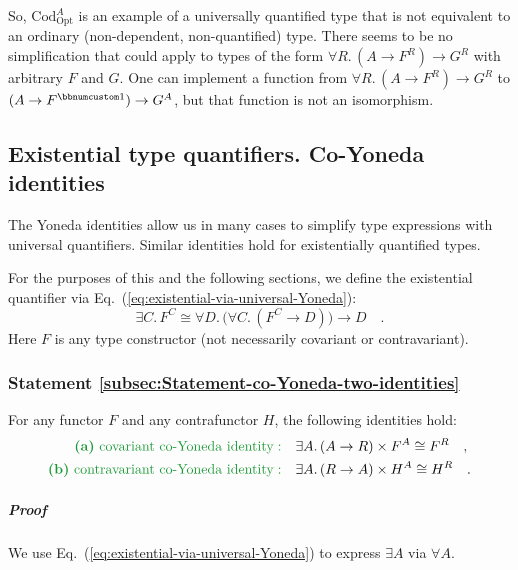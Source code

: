 So, $\text{Cod}_{\text{Opt}}^{A}$ is an example of a universally
quantified type that is not equivalent to an ordinary (non-dependent,
non-quantified) type. There seems to be no simplification that could
apply to types of the form $\forall R.\,(A\rightarrow F^{R})\rightarrow G^{R}$
with arbitrary $F$ and $G$. One can implement a function from $\forall R.\,(A\rightarrow F^{R})\rightarrow G^{R}$
to $(A\rightarrow F^{\bbnum 1})\rightarrow G^{A}$, but that function
is not an isomorphism.

\subsection{Existential type quantifiers. Co-Yoneda identities\label{subsec:Existential-type-quantifiers}}

The Yoneda identities allow us in many cases to simplify type expressions
with universal quantifiers. Similar identities hold for existentially
quantified types.

For the purposes of this and the following sections, we define the
existential quantifier via Eq.~(\ref{eq:existential-via-universal-Yoneda}):
\[
\exists C.\,F^{C}\cong\forall D.\,\big(\forall C.\,(F^{C}\rightarrow D)\big)\rightarrow D\quad.
\]
Here $F$ is any type constructor (not necessarily covariant or contravariant).

\subsubsection{Statement \label{subsec:Statement-co-Yoneda-two-identities}\ref{subsec:Statement-co-Yoneda-two-identities}}

For any functor $F$ and any contrafunctor $H$, the following identities
hold:
\begin{align*}
{\color{greenunder}\text{\textbf{(a)} }\text{covariant co-Yoneda identity}:}\quad & \exists A.\,(A\rightarrow R)\times F^{A}\cong F^{R}\quad,\\
{\color{greenunder}\text{\textbf{(b)} }\text{contravariant co-Yoneda identity}:}\quad & \exists A.\,(R\rightarrow A)\times H^{A}\cong H^{R}\quad.
\end{align*}


\subparagraph{Proof}

We use Eq.~(\ref{eq:existential-via-universal-Yoneda}) to express
$\exists A$ via $\forall A$. 

